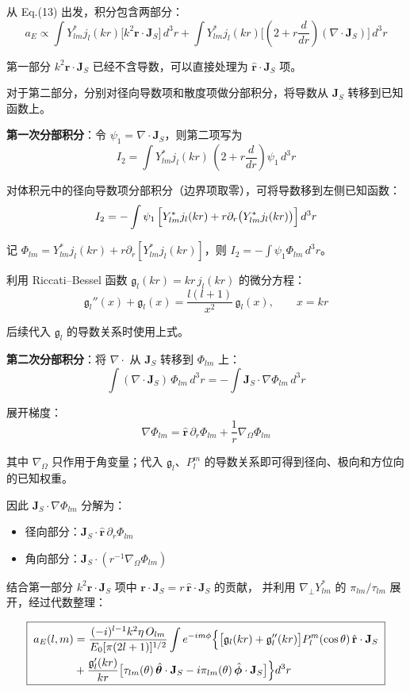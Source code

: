 从 Eq.(13) 出发，积分包含两部分：
$$
a_E \propto \int Y_{lm}^*j_l(kr)\bigl[k^2\mathbf{r}\cdot\mathbf{J}_S\bigr]\,d^3r
+ \int Y_{lm}^*j_l(kr)\bigl[\left(2+r\frac{d}{dr}\right)(\nabla\cdot\mathbf{J}_S)\bigr]\,d^3r
$$

第一部分 $k^2\mathbf{r}\cdot\mathbf{J}_S$ 已经不含导数，可以直接处理为 $\hat{\mathbf{r}}\cdot\mathbf{J}_S$ 项。

对于第二部分，分别对径向导数项和散度项做分部积分，将导数从 $\mathbf{J}_S$ 转移到已知函数上。

\textbf{第一次分部积分}：令 $\psi_1 = \nabla\cdot\mathbf{J}_S$，则第二项写为
$$
I_2 = \int Y_{lm}^*j_l(kr)\,\left(2+r\frac{d}{dr}\right)\psi_1\,d^3r
$$

对体积元中的径向导数项分部积分（边界项取零），可将导数移到左侧已知函数：
$$
I_2 = -\int \psi_1\,\Bigl[Y_{lm}^*j_l(kr)+r\partial_r\bigl(Y_{lm}^*j_l(kr)\bigr)\Bigr]\,d^3r
$$

记 $\Phi_{lm}=Y_{lm}^*j_l(kr)+r\partial_r[Y_{lm}^*j_l(kr)]$，则 $I_2=-\int\psi_1\Phi_{lm}\,d^3r$。

利用 Riccati--Bessel 函数 $\mathfrak{g}_l(kr) = kr\,j_l(kr)$ 的微分方程：
$$
\mathfrak{g}_l''(x)+\mathfrak{g}_l(x) = \frac{l(l+1)}{x^2}\,\mathfrak{g}_l(x),\qquad x=kr
$$

后续代入 $\mathfrak{g}_l$ 的导数关系时使用上式。

\textbf{第二次分部积分}：将 $\nabla\cdot$ 从 $\mathbf{J}_S$ 转移到 $\Phi_{lm}$ 上：
$$
\int (\nabla\cdot\mathbf{J}_S)\,\Phi_{lm}\,d^3r
= -\int \mathbf{J}_S\cdot\nabla\Phi_{lm}\,d^3r
$$

展开梯度：
$$
\nabla\Phi_{lm}
= \hat{\mathbf{r}}\,\partial_r\Phi_{lm} + \frac{1}{r}\nabla_\Omega\Phi_{lm}
$$

其中 $\nabla_\Omega$ 只作用于角变量；代入 $\mathfrak{g}_l$、$P_l^m$ 的导数关系即可得到径向、极向和方位向的已知权重。

因此 $\mathbf{J}_S\cdot\nabla\Phi_{lm}$ 分解为：
\begin{itemize}
  \item 径向部分：$\mathbf{J}_S\cdot\hat{\mathbf{r}}\,\partial_r\Phi_{lm}$
  \item 角向部分：$\mathbf{J}_S\cdot(r^{-1}\nabla_\Omega\Phi_{lm})$
\end{itemize}

结合第一部分 $k^2\mathbf{r}\cdot\mathbf{J}_S$ 项中 $\mathbf{r}\cdot\mathbf{J}_S = r\,\hat{\mathbf{r}}\cdot\mathbf{J}_S$ 的贡献，
并利用 $\nabla_\perp Y_{lm}^*$ 的 $\pi_{lm}/\tau_{lm}$ 展开，经过代数整理：

\begin{equation}
  \boxed{\;
    \begin{aligned}
    a_E(l,m) &= \frac{(-i)^{l-1}k^2\eta\,O_{lm}}{E_0[\pi(2l+1)]^{1/2}}
    \int e^{-im\phi}\Bigl\{
      \bigl[\mathfrak{g}_l(kr) + \mathfrak{g}_l''(kr)\bigr]P_l^m(\cos\theta)\,\hat{\mathbf{r}}\cdot\mathbf{J}_S \\
      &+ \frac{\mathfrak{g}_l'(kr)}{kr}\bigl[\tau_{lm}(\theta)\,\hat{\boldsymbol{\theta}}\cdot\mathbf{J}_S
      - i\pi_{lm}(\theta)\,\hat{\boldsymbol{\phi}}\cdot\mathbf{J}_S\bigr]
    \Bigr\} d^3r
    \end{aligned}
    \;}
  \label{eq:aE_final}
\end{equation}

